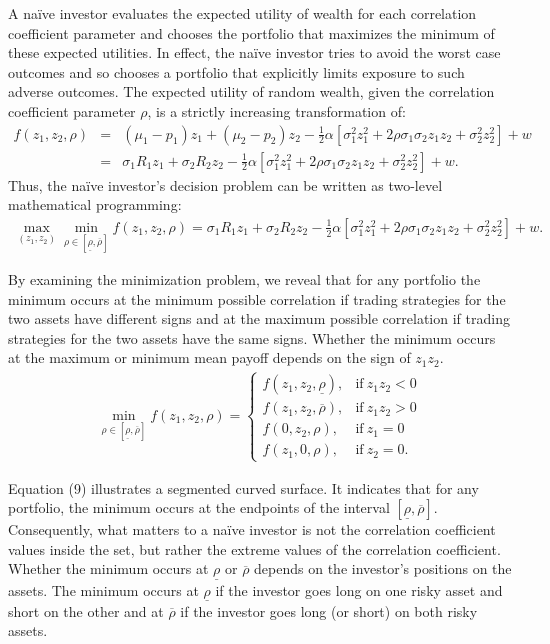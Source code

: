 \documentclass[10pt]{article}
\begin{document}
A na\"ive investor evaluates the expected utility of wealth for each correlation coefficient parameter and chooses the portfolio that maximizes the minimum of these expected utilities. In effect, the na\"ive investor tries to avoid the worst case outcomes and so chooses a portfolio that explicitly limits exposure to such adverse outcomes. The expected utility of random wealth, given the correlation coefficient parameter $ \rho $, is a strictly increasing transformation of:
\begin{eqnarray}
f (z_1, z_2, \rho) & = & (\mu_1 - p_1) z_1 + (\mu_2 - p_2) z_2 - \frac12 \alpha \left[ \sigma_1^2 z_1^2 + 2 \rho \sigma_1 \sigma_2 z_1 z_2 + \sigma_2^2 z_2^2 \right] + w \nonumber \\
& = & \sigma_1 R_1 z_1 + \sigma_2 R_2 z_2 - \frac12 \alpha \left[ \sigma_1^2 z_1^2 + 2 \rho \sigma_1 \sigma_2 z_1 z_2 + \sigma_2^2 z_2^2 \right] + w.
\end{eqnarray}
Thus, the na\"ive investor's decision problem can be written as two-level mathematical programming:
\begin{eqnarray}
\max_{(z_1, z_2)} \min_{\rho \in [\underline{\rho}, \overline{\rho}]} f (z_1, z_2, \rho) = \sigma_1 R_1 z_1 + \sigma_2 R_2 z_2 - \frac12 \alpha \left[ \sigma_1^2 z_1^2 + 2 \rho \sigma_1 \sigma_2 z_1 z_2 + \sigma_2^2 z_2^2 \right] + w.
\end{eqnarray}

By examining the minimization problem, we reveal that for any portfolio the minimum occurs at the minimum possible correlation if trading strategies for the two assets have different signs and at the maximum possible correlation if trading strategies for the two assets have the same signs. Whether the minimum occurs at the maximum or minimum mean payoff depends on the sign of $ z_1 z_2 $. 
\begin{eqnarray}
\min_{\rho \in [\underline{\rho}, \overline{\rho}]} f (z_1, z_2, \rho) 
= \left\{ \begin{matrix} 
f (z_1, z_2, \underline{\rho}), & \text{if} \ z_1 z_2 < 0 \\ 
f (z_1, z_2, \overline{\rho}), & \text{if} \ z_1 z_2 > 0 \\
f (0, z_2, \rho), & \text{if} \ z_1 = 0 \\ 
f (z_1, 0, \rho), & \text{if} \ z_2 = 0.
\end{matrix} \right.
\end{eqnarray}

Equation (9) illustrates a segmented curved surface. It indicates that for any portfolio, the minimum occurs at the endpoints of the interval $ [\underline{\rho}, \overline{\rho}] $. Consequently, what matters to a na\"ive investor is not the correlation coefficient values inside the set, but rather the extreme values of the correlation coefficient. Whether the minimum occurs at $ \underline{\rho} $ or $ \overline{\rho} $ depends on the investor's positions on the assets. The minimum occurs at $ \underline{\rho} $ if the investor goes long on one risky asset and short on the other and at $ \overline{\rho} $ if the investor goes long (or short) on both risky assets.
\end{document}
